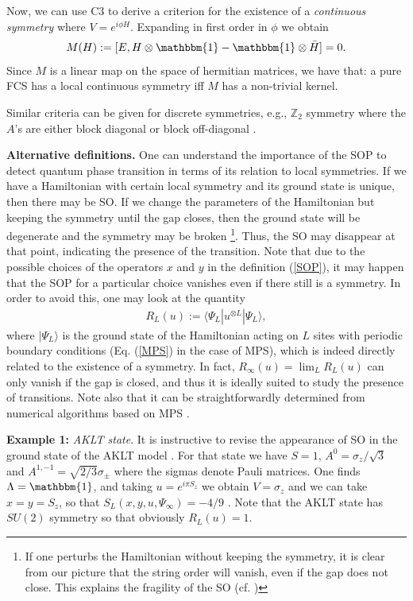 \documentclass[prl,floatfix,showpacs,amsmat,twocolumn]{revtex4}
\newcommand{\be}{\begin{eqnarray}}
\newcommand{\ee}{\end{eqnarray}}
\newcommand{\1}{\mathbbm{1}}
\renewcommand{\>}{\rangle}
\newcommand{\<}{\langle}
\newcommand{\vs}{\vspace*{4pt}}
\begin{document}
Now, we can use C3 to derive a criterion for the existence of a
    {\em continuous symmetry} where $V=e^{i\phi H}$. Expanding in
first order in $\phi$ we obtain
\be
    M(H):= [E,H\otimes\1  -\1\otimes \bar H]=0.
\ee
Since $M$ is a linear map on the space of hermitian matrices, we
have that: a pure FCS has a local continuous symmetry iff $M$ has
a non-trivial kernel.

Similar criteria can be given for discrete symmetries, e.g.,
$\mathbb{Z}_2$ symmetry where the $A$'s are either block diagonal
or block off-diagonal \cite{forthcoming}. \vs

\textbf{Alternative definitions.} One can understand the
importance of the SOP to detect quantum phase transition in terms
of its relation to local symmetries. If we have a Hamiltonian with
certain local symmetry and its ground state is unique, then there
may be SO. If we change the parameters of the Hamiltonian but
keeping the symmetry until the gap closes, then the ground state
will be degenerate and the symmetry may be broken \footnote{If one
    perturbs the Hamiltonian without keeping the symmetry, it is clear
    from our picture that the string order will vanish, even if the
    gap does not close. This explains the fragility of the SO (cf.
    \cite{fragility})}. Thus, the SO may disappear at that point,
indicating the presence of the transition. Note that due to the
possible choices of the operators $x$ and $y$ in the definition
(\ref{SOP}), it may happen that the SOP for a particular choice
vanishes even if there still is a symmetry. In order to avoid
this, one may look at the quantity
\be
    \label{RL}
    R_L(u):=\langle\Psi_L|u^{\otimes L}|\Psi_L\rangle,
\ee
where $|\Psi_L\>$ is the ground state of the Hamiltonian acting on $L$ sites with periodic boundary conditions (Eq. (\ref{MPS}) in the case of MPS), which is
indeed directly related to the existence of a symmetry. In fact,
$R_\infty(u)=\lim_L R_L(u)$ can only vanish if the gap is closed,
and thus it is ideally suited to study the presence of
transitions. Note also that it can be straightforwardly determined
from numerical algorithms based on MPS \cite{MPS-numerics}. \vs

{\bf Example 1:} {\em AKLT state}. It is instructive to revise the
appearance of SO in the ground state of the AKLT model
\cite{AKLT}. For that state we have $S=1$, $A^0=\sigma_z/\sqrt{3}$
and $A^{1,-1}=\sqrt{2/3}\sigma_\pm$ where the sigmas denote Pauli
matrices. One finds $\Lambda=\1$, and taking $u=e^{i\pi S_z}$ we
obtain $V=\sigma_z$ and we can take $x=y=S_z$, so that
$S_L(x,y,u,\Psi_\infty)=-4/9$ \cite{SOP-history-1}. Note that the
AKLT state has  $SU(2)$ symmetry so that obviously $R_L(u)=1$. \vs
\end{document}
